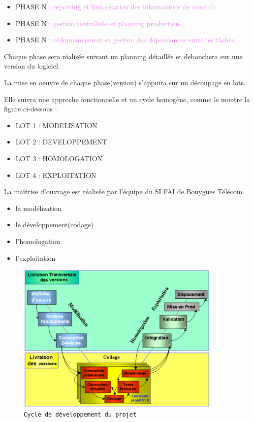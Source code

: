\documentclass{bouygues-fr}
\begin{document}
\begin{itemize}
\item PHASE N : \textcolor{violet}{reporting et historisation des informations de crontab}
\item PHASE N : \textcolor{violet}{gestion centralisée et planning production}
\item PHASE N : \textcolor{violet}{ordonnancement et gestion des dépendances entre les tâches}
\end{itemize}


Chaque phase sera réalisée suivant un planning  détaillée et debouchera sur une version du logiciel.

La mise en oeuvre de chaque phase(version) s’appuira sur un découpage en lots.

Elle suivra une approche fonctionnelle et un cycle homogène, comme le montre la figure ci-dessous :

\begin{itemize}
\item LOT 1 : MODELISATION
\item LOT 2 : DEVELOPPEMENT
\item LOT 3 : HOMOLOGATION
\item LOT 4 : EXPLOITATION
\end{itemize}


La maîtrise d’ouvrage est réalisée par l'équipe du SI FAI de Bouygues Télécom.

\begin{itemize}
\item la modélisation
\item le développement(codage)
\item l'homologation
\item l'exploitation
\end{itemize}

 \begin{figure}[H]
    \begin{center}
      \includegraphics[width=10cm]{CycleDev.pdf}
    \end{center}
    \caption{\scriptsize \texttt{Cycle de développement du projet}}
  \end{figure}
  
\end{document}
